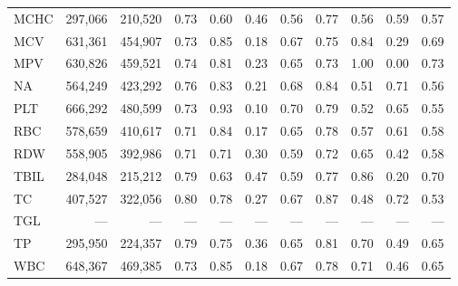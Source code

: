 \begin{table}[ht]
\begin{tabular}{lrrrrrrrrrr}
MCHC & 297,066 & 210,520 & 0.73 & 0.60 & 0.46 & 0.56 & 0.77 & 0.56 & 0.59 & 0.57 \\
MCV & 631,361 & 454,907 & 0.73 & 0.85 & 0.18 & 0.67 & 0.75 & 0.84 & 0.29 & 0.69 \\
MPV & 630,826 & 459,521 & 0.74 & 0.81 & 0.23 & 0.65 & 0.73 & 1.00 & 0.00 & 0.73 \\
NA & 564,249 & 423,292 & 0.76 & 0.83 & 0.21 & 0.68 & 0.84 & 0.51 & 0.71 & 0.56 \\
PLT & 666,292 & 480,599 & 0.73 & 0.93 & 0.10 & 0.70 & 0.79 & 0.52 & 0.65 & 0.55 \\
RBC & 578,659 & 410,617 & 0.71 & 0.84 & 0.17 & 0.65 & 0.78 & 0.57 & 0.61 & 0.58 \\
RDW & 558,905 & 392,986 & 0.71 & 0.71 & 0.30 & 0.59 & 0.72 & 0.65 & 0.42 & 0.58 \\
TBIL & 284,048 & 215,212 & 0.79 & 0.63 & 0.47 & 0.59 & 0.77 & 0.86 & 0.20 & 0.70 \\
TC & 407,527 & 322,056 & 0.80 & 0.78 & 0.27 & 0.67 & 0.87 & 0.48 & 0.72 & 0.53 \\
TGL & --- & --- & --- & --- & --- & --- & --- & --- & --- & --- \\
TP & 295,950 & 224,357 & 0.79 & 0.75 & 0.36 & 0.65 & 0.81 & 0.70 & 0.49 & 0.65 \\
WBC & 648,367 & 469,385 & 0.73 & 0.85 & 0.18 & 0.67 & 0.78 & 0.71 & 0.46 & 0.65 \\
\bottomrule
\end{tabular}
\label{tab:chs_eval_t2d}
\end{table}